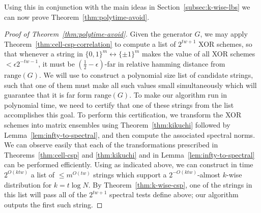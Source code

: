 \documentclass[11pt]{article}
\newcommand{\rng}{\mathrm{range}}
\begin{document}
Using this in conjunction with the main ideas in Section~\ref{subsec:k-wise-lbs} we can now prove Theorem~\ref{thm:polytime-avoid}.
\begin{proof}[Proof of Theorem~\ref{thm:polytime-avoid}]
Given the generator $G$, we may apply Theorem~\ref{thm:cell-csp-correlation} to compute a list of $2^{tw+1}$ XOR schemes, so that whenever a string in $\{0,1\}^m \leftrightarrow\{\pm 1\}^m$ makes the value of all XOR schemes $< \epsilon2^{-tw-1}$, it must be $(\frac{1}{2}-\epsilon)$-far in relative hamming distance from $\rng(G)$. We will use \cite{naornaor} to construct a polynomial size list of candidate strings, such that one of them must make all such values small simultaneously which will guarantee that it is far form $\rng(G)$. To make our algorithm run in polynomial time, we need to certify that one of these strings from the list accomplishes this goal.
To perform this certification, we transform the XOR schemes into matrix ensembles using Theorem~\ref{thm:kikuchi} followed by Lemma~\ref{lem:infty-to-spectral}, and then compute the associated spectral norms. We can observe easily that each of the transformations prescribed in Theorems~\ref{thm:cell-csp} and \ref{thm:kikuchi} and in Lemma~\ref{lem:infty-to-spectral} can be performed efficiently.
Using \cite{naornaor} as indicated above, we can construct in time $2^{O(ktw)}$ a list of $\leq m^{O(tw)}$ strings which support a $2^{-O(ktw)}$-almost $k$-wise distribution for $k= t\log N$. By Theorem~\ref{thm:k-wise-csp}, one of the strings in this list will pass all of the $2^{tw+1}$ spectral tests define above; our algorithm outputs the first such string.
\end{proof}
\end{document}
